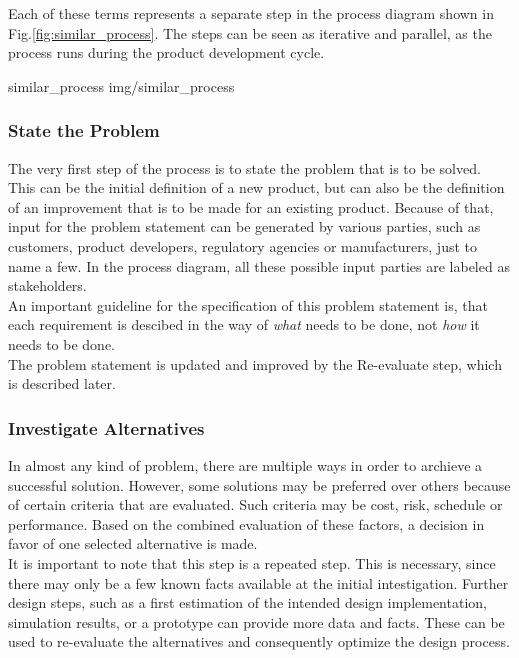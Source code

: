 Each of these terms represents a separate step in the process diagram shown in Fig.\ref{fig:similar_process}.
The steps can be seen as iterative and parallel, as the process runs during the product development cycle.

 {similar_process} {img/similar_process}

\subsubsection{State the Problem}

The very first step of the process is to state the problem that is to be solved.
This can be the initial definition of a new product, but can also be the definition of an improvement that is to be made for an existing product.
Because of that, input for the problem statement can be generated by various parties, such as customers, product developers, regulatory agencies or manufacturers, just to name a few.
In the process diagram, all these possible input parties are labeled as stakeholders.\\

An important guideline for the specification of this problem statement is, that each requirement is descibed in the way of \textit{what} needs to be done, not \textit{how} it needs to be done.\\

The problem statement is updated and improved by the Re-evaluate step, which is described later.

\subsubsection{Investigate Alternatives}

In almost any kind of problem, there are multiple ways in order to archieve a successful solution.
However, some solutions may be preferred over others because of certain criteria that are evaluated.
Such criteria may be cost, risk, schedule or performance.
Based on the combined evaluation of these factors, a decision in favor of one selected alternative is made.\\

It is important to note that this step is a repeated step.
This is necessary, since there may only be a few known facts available at the initial intestigation.
Further design steps, such as a first estimation of the intended design implementation, simulation results, or a prototype can provide more data and facts.
These can be used to re-evaluate the alternatives and consequently optimize the design process.


